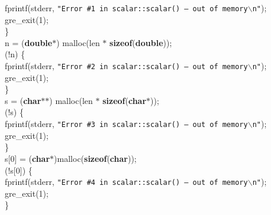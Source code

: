 \begin{flushleft}
\hspace*{8\indentation}fprintf(stderr, {\tt"Error \#1 in scalar::scalar() -- out of memory$\backslash$n"});\mbox{}\\
\hspace*{8\indentation}gre\_exit(1);\mbox{}\\
\hspace*{4\indentation}\}\mbox{}\\
\hspace*{4\indentation}n = ({\bf double}$\ast$) malloc(len $\ast$ {\bf sizeof}({\bf double}));\mbox{}\\
\hspace*{4\indentation}{\bf if} (!n) \{\mbox{}\\
\hspace*{8\indentation}fprintf(stderr, {\tt"Error \#2 in scalar::scalar() -- out of memory$\backslash$n"});\mbox{}\\
\hspace*{8\indentation}gre\_exit(1);\mbox{}\\
\hspace*{4\indentation}\}\mbox{}\\
\hspace*{4\indentation}s = ({\bf char}$\ast$$\ast$) malloc(len $\ast$ {\bf sizeof}({\bf char}$\ast$));\mbox{}\\
\hspace*{4\indentation}{\bf if} (!s) \{\mbox{}\\
\hspace*{8\indentation}fprintf(stderr, {\tt"Error \#3 in scalar::scalar() -- out of memory$\backslash$n"});\mbox{}\\
\hspace*{8\indentation}gre\_exit(1);\mbox{}\\
\hspace*{4\indentation}\}\mbox{}\\
\hspace*{4\indentation}s[0] = ({\bf char}$\ast$)malloc({\bf sizeof}({\bf char}));\mbox{}\\
\hspace*{4\indentation}{\bf if} (!s[0]) \{\mbox{}\\
\hspace*{8\indentation}fprintf(stderr, {\tt"Error \#4 in scalar::scalar() -- out of memory$\backslash$n"});\mbox{}\\
\hspace*{8\indentation}gre\_exit(1);\mbox{}\\
\hspace*{4\indentation}\}\mbox{}\\
$$
\end{flushleft}

